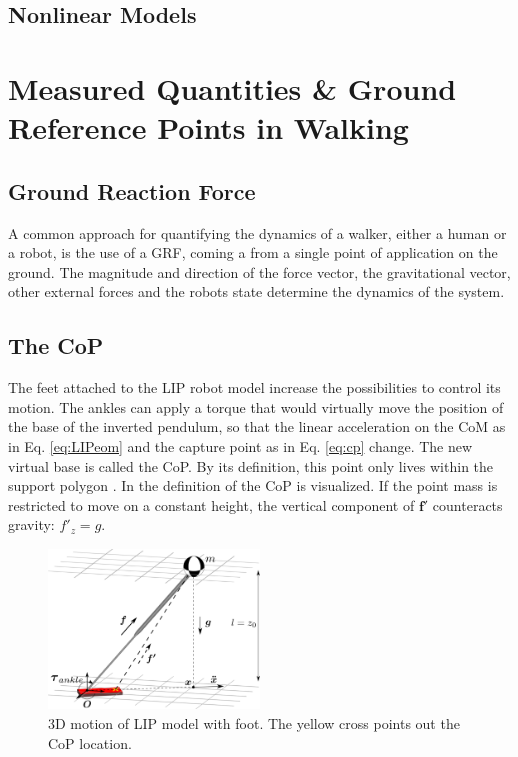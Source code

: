 \subsection{Nonlinear Models}

\section{Measured Quantities \& Ground Reference Points in Walking}

\subsection{Ground Reaction Force}
A common approach for quantifying the dynamics of a walker, either a human or a robot, is the use of a \ac{GRF}, coming a from a single point of application on the ground. The magnitude and direction of the force vector, the gravitational vector, other external forces and the robots state determine the dynamics of the system. 


\subsection{The \ac{CoP}}
The feet attached to the \ac{LIP} robot model increase the possibilities to control its motion. The ankles can apply a torque that would virtually move the position of the base of the inverted pendulum, so that the linear acceleration on the \ac{CoM} as in Eq. \eqref{eq:LIPeom} and the capture point as in Eq. \eqref{eq:cp} change. The new virtual base is called the \ac{CoP}. By its definition, this point only lives within the support polygon \cite{vukobratovic2004zero}. In  the definition of the \ac{CoP} is visualized. If the point mass is restricted to move on a constant height, the vertical component of $\boldsymbol{f'}$ counteracts gravity: $f'_z=g$. 
\begin{figure}[h]
\centering
\includegraphics[width=0.5\textwidth]{STYLESTUFF/3DCoMwithfoot.png}
\caption{\ac{3D} motion of \ac{LIP} model with foot. The yellow cross points out the \ac{CoP} location.}
\label{fig:3dlipfoot}
\end{figure}
